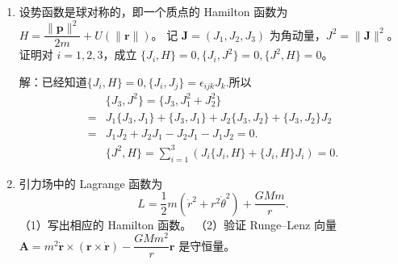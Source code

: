 \begin{enumerate}
    \item 设势函数是球对称的，即一个质点的 Hamilton 函数为 $H=\dfrac{\|\boldsymbol{p}\|^2}{2m}+U(\|\boldsymbol{r}\|)$。
    记 $\boldsymbol{J}=(J_1, J_2, J_3)$ 为角动量，$J^2=\|\boldsymbol{J}\|^2$。
    证明对 $i=1,2,3$，成立 $\{J_i, H\}=0,\{J_i, J^2\}=0,\{J^2, H\}=0$。

    解：已经知道$\{J_i,H\}=0, \{J_i, J_j\}=\epsilon_{ijk}J_k$.所以
    \begin{align*}
        &\{J_3, J^2\}=\{J_3, J_1^2+J_2^2\}\\
        =&J_1\{J_3,J_1\}+\{J_3,J_1\}+J_2\{J_3,J_2\}+\{J_3,J_2\}J_2\\
        =&J_1J_2+J_2J_1-J_2J_1-J_1J_2=0.\\
        &\{J^2,H\}=\sum_{i=1}^3(J_i\{J_i,H\}+\{J_i,H\}J_i)=0.
    \end{align*}
    \item 引力场中的 Lagrange 函数为
    $$L=\frac{1}{2} m(\dot{r}^2+r^2 \dot{\theta}^2)+\frac{GMm}{r}.$$
    （1）写出相应的 Hamilton 函数。
    （2）验证 Runge--Lenz 向量 $\boldsymbol{A}=m^2\dot{\boldsymbol{r}}\times(\boldsymbol{r}\times\dot{\boldsymbol{r}})-\dfrac{GMm^2}{r}\boldsymbol{r}$ 是守恒量。
\end{enumerate}
\printfootnotes

